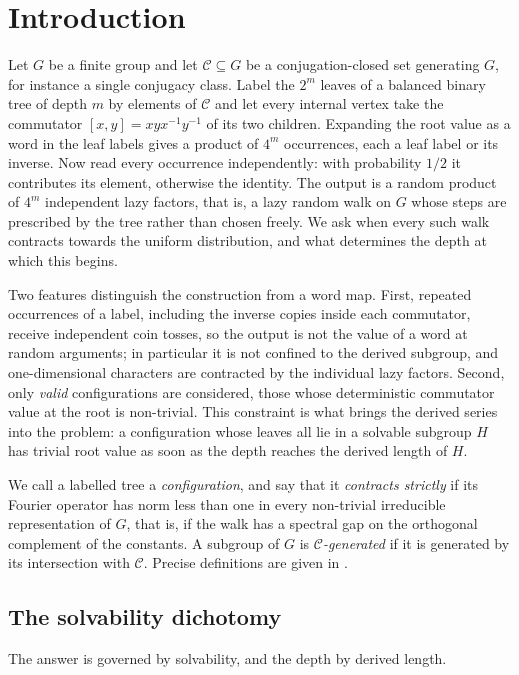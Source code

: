 \section{Introduction}
\label{sec:intro}

Let $G$ be a finite group and let $\mathcal C\subseteq G$ be a
conjugation-closed set generating $G$, for instance a single conjugacy
class. Label the $2^m$ leaves of a balanced binary tree of depth $m$ by
elements of $\mathcal C$ and let every internal vertex take the commutator
$[x,y]=xyx^{-1}y^{-1}$ of its two children. Expanding the root value as a
word in the leaf labels gives a product of $4^m$ occurrences, each a leaf
label or its inverse. Now read every occurrence independently: with
probability $1/2$ it contributes its element, otherwise the identity. The
output is a random product of $4^m$ independent lazy factors, that is, a
lazy random walk on $G$ whose steps are prescribed by the tree rather than
chosen freely. We ask when every such walk contracts towards the uniform
distribution, and what determines the depth at which this begins.

Two features distinguish the construction from a word map. First,
repeated occurrences of a label, including the inverse copies inside each
commutator, receive independent coin tosses, so the output is not the
value of a word at random arguments; in particular it is not confined to
the derived subgroup, and one-dimensional characters are contracted by
the individual lazy factors. Second, only \emph{valid} configurations are
considered, those whose deterministic commutator value at the root is
non-trivial. This constraint is what brings the derived series into the
problem: a configuration whose leaves all lie in a solvable subgroup $H$
has trivial root value as soon as the depth reaches the derived length of
$H$.

We call a labelled tree a \emph{configuration}, and say that it
\emph{contracts strictly} if its Fourier operator has norm less than one
in every non-trivial irreducible representation of $G$, that is, if the
walk has a spectral gap on the orthogonal complement of the constants. A
subgroup of $G$ is \emph{$\mathcal C$-generated} if it is generated by
its intersection with $\mathcal C$. Precise definitions are given in
.

\subsection*{The solvability dichotomy}
The answer is governed by solvability, and the depth by derived length.

